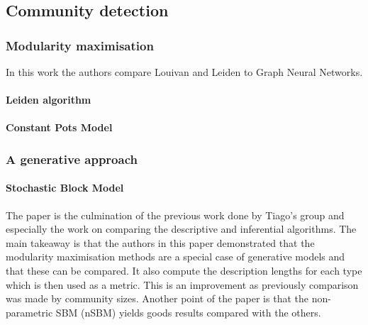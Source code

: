 

\subsection{Community detection}


\subsubsection{Modularity maximisation}

In this work the authors \cite{Sobolevsky2022-di} compare Louivan \cite{Blondel2008-ik} and Leiden to Graph Neural Networks.

\paragraph*{Leiden algorithm}


\paragraph*{Constant Pots Model}





\subsubsection{A generative approach}

\paragraph*{Stochastic Block Model}

The paper \cite{Peixoto2023-rt} is the culmination of the previous work done by Tiago's group and especially the work on comparing the descriptive and inferential algorithms. The main takeaway is that the authors in this paper demonstrated that the modularity maximisation methods are a special case of generative models and that these can be compared. It also compute the description lengths for each type which is then used as a metric. This is an improvement as previously \citet{Peixoto2021-jx} comparison was made by community sizes. Another point of the paper is that the non-parametric SBM (nSBM) \cite{Peixoto2014-yb} yields goods results compared with the others.

